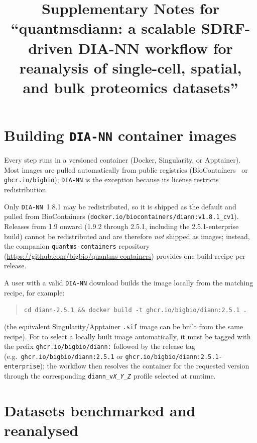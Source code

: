 \documentclass[preprint,12pt]{elsarticle}
\begin{document}
\begin{frontmatter}
\title{Supplementary Notes for ``quantmsdiann: a scalable SDRF-driven DIA-NN workflow for reanalysis of single-cell, spatial, and bulk proteomics datasets''}
\end{frontmatter}

\tableofcontents
\vspace{1em}

\section{Building \texttt{DIA-NN} container images}
\label{sec:supp-containers}

Every \quantmsdiann{} step runs in a versioned container (Docker, Singularity, or Apptainer). Most images are pulled automatically from public registries (BioContainers~\cite{biocontainers2017} or \texttt{ghcr.io/bigbio}); \texttt{DIA-NN} is the exception because its license restricts redistribution.

Only \texttt{DIA-NN}~1.8.1 may be redistributed, so it is shipped as the default and pulled from BioContainers (\texttt{docker.io/biocontainers/diann:v1.8.1\_cv1}). Releases from 1.9 onward (1.9.2 through 2.5.1, including the 2.5.1-enterprise build) cannot be redistributed and are therefore \emph{not} shipped as images; instead, the companion \texttt{quantms-containers} repository (\url{https://github.com/bigbio/quantms-containers}) provides one build recipe per release.

A user with a valid \texttt{DIA-NN} download builds the image locally from the matching recipe, for example:
\begin{quote}
\texttt{cd diann-2.5.1 \&\& docker build -t ghcr.io/bigbio/diann:2.5.1 .}
\end{quote}
(the equivalent Singularity/Apptainer \texttt{.sif} image can be built from the same recipe). For \quantmsdiann{} to select a locally built image automatically, it must be tagged with the prefix \texttt{ghcr.io/bigbio/diann:} followed by the release tag (e.g.\ \texttt{ghcr.io/bigbio/diann:2.5.1} or \texttt{ghcr.io/bigbio/diann:2.5.1-enterprise}); the workflow then resolves the container for the requested version through the corresponding \texttt{diann\_v\textit{X\_Y\_Z}} profile selected at runtime.

\section{Datasets benchmarked and reanalysed}
\label{sec:supp-datasets}
\end{document}
